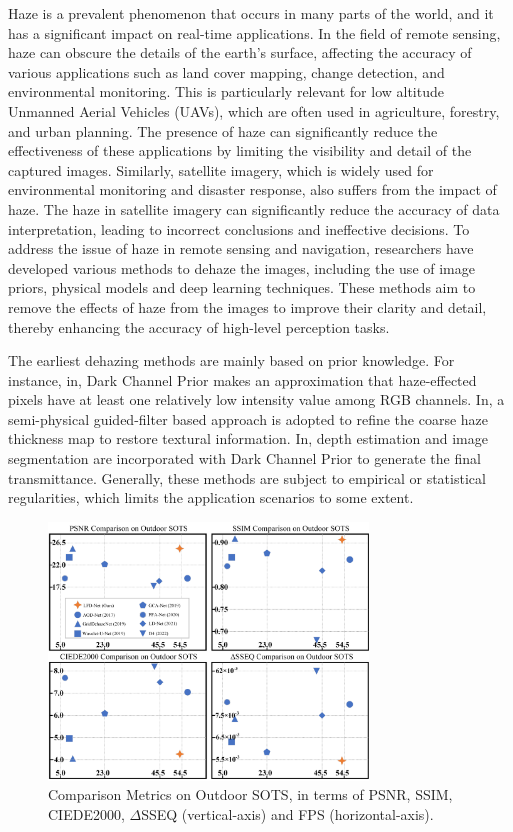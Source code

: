 \documentclass[lettersize,journal]{IEEEtran}
\begin{document}
Haze is a prevalent phenomenon that occurs in many parts of the world, and it has a significant impact on real-time applications. In the field of remote sensing, haze can obscure the details of the earth's surface, affecting the accuracy of various applications such as land cover mapping, change detection, and environmental monitoring. This is particularly relevant for low altitude Unmanned Aerial Vehicles (UAVs), which are often used in agriculture, forestry, and urban planning. The presence of haze can significantly reduce the effectiveness of these applications by limiting the visibility and detail of the captured images. Similarly, satellite imagery, which is widely used for environmental monitoring and disaster response, also suffers from the impact of haze. The haze in satellite imagery can significantly reduce the accuracy of data interpretation, leading to incorrect conclusions and ineffective decisions\cite{zheng2022dehaze, han2021edge}. To address the issue of haze in remote sensing and navigation, researchers have developed various methods to dehaze the images, including the use of image priors, physical models and deep learning techniques. These methods aim to remove the effects of haze from the images to improve their clarity and detail, thereby enhancing the accuracy of high-level perception tasks. 

The earliest dehazing methods are mainly based on prior knowledge. For instance, in\cite{he2010single}, Dark Channel Prior makes an approximation that haze-effected pixels have at least one relatively low intensity value among RGB channels. 
In\cite{liu2021semiphysical}, a semi-physical guided-filter based approach is adopted to refine the coarse haze thickness map to restore textural information. In\cite{xie2021image}, depth estimation and image segmentation are incorporated with Dark Channel Prior to generate the final transmittance. Generally, these methods are subject to empirical or statistical regularities, which limits the application scenarios to some extent.

\begin{figure}[t]
    \centering
    \includegraphics[width=8.5cm]{sample.png}
    \caption{Comparison Metrics on Outdoor SOTS, in terms of PSNR, SSIM, CIEDE2000, $\Delta$SSEQ (vertical-axis) and FPS (horizontal-axis).}
    \label{sample}
\end{figure}
\end{document}
